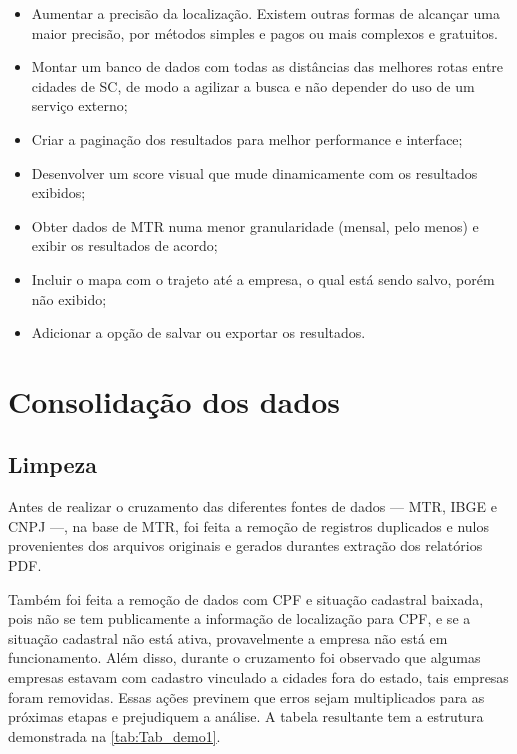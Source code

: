 \begin{itemize} 
	\item Aumentar a precisão da localização. Existem outras formas de alcançar uma maior precisão, por métodos simples e pagos ou mais complexos e gratuitos.
  \item Montar um banco de dados com todas as distâncias das melhores rotas entre cidades de SC, de modo a agilizar a busca e não depender do uso de um serviço externo;
  \item Criar a paginação dos resultados para melhor performance e interface;
  \item Desenvolver um score visual que mude dinamicamente com os resultados exibidos;
  \item Obter dados de \gls{MTR} numa menor granularidade (mensal, pelo menos) e exibir os resultados de acordo;
  \item Incluir o mapa com o trajeto até a empresa, o qual está sendo salvo, porém não exibido;
  \item Adicionar a opção de salvar ou exportar os resultados.
\end{itemize}

\section{Consolidação dos dados}\label{section:consolida}

\subsection{Limpeza}

Antes de realizar o cruzamento das diferentes fontes de dados — \gls{MTR}, \gls{IBGE} e \gls{CNPJ} —, na base de \gls{MTR}, foi feita a remoção de registros duplicados e nulos provenientes dos arquivos originais e gerados durantes extração dos relatórios \gls{PDF}. 

Também foi feita a remoção de dados com \gls{CPF} e situação cadastral baixada, pois não se tem publicamente a informação de localização para \gls{CPF}, e se a situação cadastral não está ativa, provavelmente a empresa não está em funcionamento. Além disso, durante o cruzamento foi observado que algumas empresas estavam com cadastro vinculado a cidades fora do estado, tais empresas foram removidas. Essas ações previnem que erros sejam multiplicados para as próximas etapas e prejudiquem a análise. A tabela resultante tem a estrutura demonstrada na \autoref{tab:Tab_demo1}.

